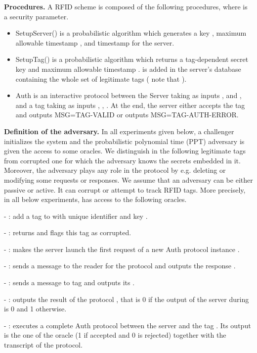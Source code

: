\documentclass{easychair}
\begin{document}
\textbf{Procedures.} A RFID scheme is composed of the following procedures, where
 is a security parameter.

\begin{itemize}
\item{SetupServer()} is a probabilistic algorithm which generates a key , maximum allowable timestamp , and timestamp 
for the server. 
\item{SetupTag()} is a probabilistic algorithm which returns a tag-dependent
secret key  and maximum allowable timestamp .  is added in the server's database  containing
the whole set of legitimate tags ( note that ).
\item{Auth} is an interactive protocol  between the Server  taking as inputs ,  and , and a tag  taking as inputs , , . At the end, the server either accepts the tag and outputs MSG=TAG-VALID or outputs MSG=TAG-AUTH-ERROR.
\end{itemize}


\textbf{Definition of the adversary.} In all experiments given below, a challenger 
initializes the system and the probabilistic polynomial time (PPT) adversary is given the access to some oracles.
We distinguish in the following legitimate tags from corrupted one for which
the adversary knows the secrets embedded in it. Moreover, the adversary plays
any role in the protocol by e.g. deleting or modifying some requests or
responses. We assume that an
adversary can be either passive or active. It can corrupt or
attempt to track RFID tags. More precisely, in all below experiments,  has access to the following oracles.

- : add a tag to  with unique identifier  and key .

- : returns  and flags this tag as corrupted.

- : makes the server launch the first request of a new Auth protocol
instance .

- : sends a message  to the reader for the protocol  and
outputs the response .

- : sends a message  to tag  and outputs its .

- : outputs the result of the protocol , that is 0 if the output of the
server during  is 0 and 1 otherwise.

- : executes a complete Auth protocol between the server and the
tag . Its output is the one of the  oracle (1 if accepted and 0 is
rejected) together with the transcript of the protocol.
\end{document}
